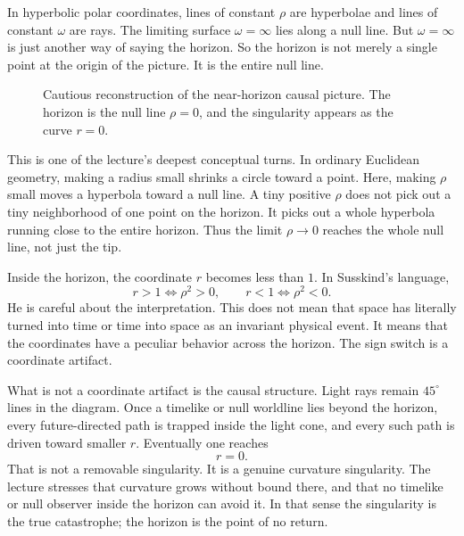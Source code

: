 In hyperbolic polar coordinates, lines of constant \(\rho\) are hyperbolae and lines of constant \(\omega\) are rays. The limiting surface \(\omega=\infty\) lies along a null line. But \(\omega=\infty\) is just another way of saying the horizon. So the horizon is not merely a single point at the origin of the picture. It is the entire null line.

\begin{figure}[htbp]
\centering
{}
\caption{Cautious reconstruction of the near-horizon causal picture. The horizon is the null line \(\rho=0\), and the singularity appears as the curve \(r=0\).}
\end{figure}

This is one of the lecture's deepest conceptual turns. In ordinary Euclidean geometry, making a radius small shrinks a circle toward a point. Here, making \(\rho\) small moves a hyperbola toward a null line. A tiny positive \(\rho\) does not pick out a tiny neighborhood of one point on the horizon. It picks out a whole hyperbola running close to the entire horizon. Thus the limit \(\rho\to 0\) reaches the whole null line, not just the tip.

Inside the horizon, the coordinate \(r\) becomes less than \(1\). In Susskind's language,
\begin{equation}
r>1 \Longleftrightarrow \rho^2>0,
\qquad
r<1 \Longleftrightarrow \rho^2<0.
\end{equation}
He is careful about the interpretation. This does not mean that space has literally turned into time or time into space as an invariant physical event. It means that the coordinates have a peculiar behavior across the horizon. The sign switch is a coordinate artifact.

What is not a coordinate artifact is the causal structure. Light rays remain \(45^\circ\) lines in the diagram. Once a timelike or null worldline lies beyond the horizon, every future-directed path is trapped inside the light cone, and every such path is driven toward smaller \(r\). Eventually one reaches
\begin{equation}
r=0.
\end{equation}
That is not a removable singularity. It is a genuine curvature singularity. The lecture stresses that curvature grows without bound there, and that no timelike or null observer inside the horizon can avoid it. In that sense the singularity is the true catastrophe; the horizon is the point of no return.

